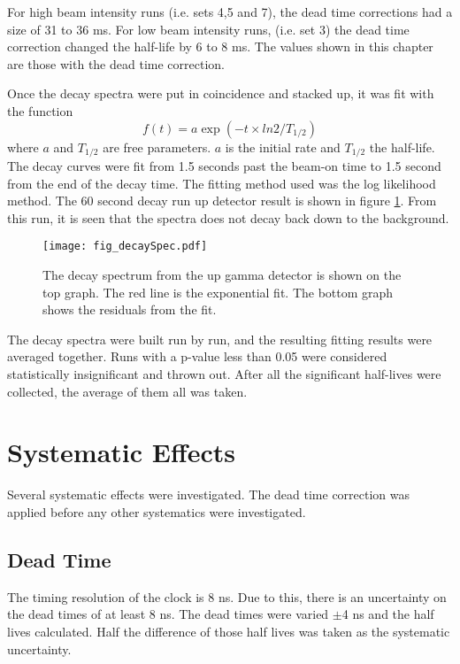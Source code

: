 \documentclass[MaxHughesThesis.tex]{subfiles}
\begin{document}
For high beam intensity runs (i.e. sets 4,5 and 7), the dead time corrections had a size of 31 to 36 ms.
For low beam intensity runs, (i.e. set 3) the dead time correction changed the half-life by 6 to 8 ms. 
The values shown in this chapter are those with the dead time correction.

Once the decay spectra were put in coincidence and stacked up, it was fit with the function
%
\begin{equation}
	f(t) = a\exp{(-t \times ln2/T_{1/2})}
	\label{eq:fit-function}
\end{equation}
%
where $a$ and $T_{1/2}$ are free parameters.
$a$ is the initial rate and $T_{1/2}$ the half-life.
The decay curves were fit from 1.5 seconds past the beam-on time to 1.5 second from the end of the decay time. 
The fitting method used was the log likelihood method. 
The 60 second decay run up detector result is shown in figure \ref{fig:60secdecay}.
From this run, it is seen that the spectra does not decay back down to the background. 

\begin{figure}[!htb]
\centerline{\texttt{[image: fig\_decaySpec.pdf]}}
\caption{The decay spectrum from the up gamma detector is shown on the top graph.
	The red line is the exponential fit. 
	The bottom graph shows the residuals from the fit. 
	}
\label{fig:60secdecay}
\end{figure}


The decay spectra were built run by run, and the resulting fitting results were averaged together. 
Runs with a p-value less than 0.05 were considered statistically insignificant and thrown out.
After all the significant half-lives were collected, the average of them all was taken.

\section{Systematic Effects}
Several systematic effects were investigated. 
The dead time correction was applied before any other systematics were investigated. 

\subsection{Dead Time}
The timing resolution of the clock is 8 ns.
Due to this, there is an uncertainty on the dead times of at least 8 ns.
The dead times were varied $\pm$4 ns and the half lives calculated.
Half the difference of those half lives was taken as the systematic uncertainty.
\end{document}
